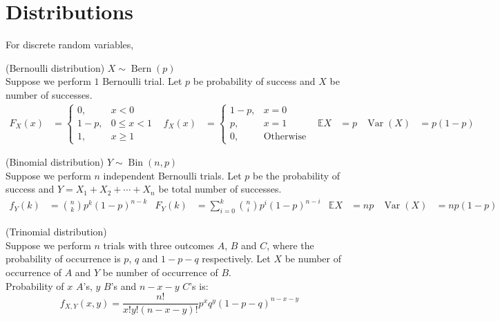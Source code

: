 \documentclass{huhtakm-template-book}
\newcommand{\expect}{\mathbb{E}}
\DeclareMathOperator{\Bern}{Bern}
\DeclareMathOperator{\Bin}{Bin}
\DeclareMathOperator{\Var}{Var}
\begin{document}
\section*{Distributions}
    For discrete random variables,
    \begin{seg}(Bernoulli distribution) $X\sim\Bern(p)$\\
        Suppose we perform $1$ Bernoulli trial. Let $p$ be probability of success and $X$ be number of successes.
        \begin{align*}
            F_{X}(x)&=\begin{cases}
                0, &x<0\\
                1-p, &0\leq x<1\\
                1, &x\geq 1
            \end{cases} & f_{X}(x)&=\begin{cases}
                1-p, &x=0\\
                p, &x=1\\
                0, &\text{Otherwise}
            \end{cases} & \expect X&=p & \Var(X)&=p(1-p)
        \end{align*}
    \end{seg}
    \begin{seg}(Binomial distribution) $Y\sim\Bin(n,p)$\\
        Suppose we perform $n$ independent Bernoulli trials. Let $p$ be the probability of success and $Y=X_{1}+X_{2}+\cdots+X_{n}$ be total number of successes.
        \begin{align*}
            f_{Y}(k)&=\binom{n}{k}p^{k}(1-p)^{n-k} & F_{Y}(k)&=\sum_{i=0}^{k}\binom{n}{i}p^{i}(1-p)^{n-i} & \expect X&=np & \Var(X)&=np(1-p)
        \end{align*}
    \end{seg}
    \begin{seg}(Trinomial distribution)\\
        Suppose we perform $n$ trials with three outcomes $A$, $B$ and $C$, where the probability of occurrence is $p$, $q$ and $1-p-q$ respectively. Let $X$ be number of occurrence of $A$ and $Y$ be number of occurrence of $B$.\\
        Probability of $x$ $A$'s, $y$ $B$'s and $n-x-y$ $C$'s is:
        \begin{equation*}
            f_{X,Y}(x,y)=\frac{n!}{x!y!(n-x-y)!}p^{x}q^{y}(1-p-q)^{n-x-y}
        \end{equation*}
    \end{seg}
\end{document}
